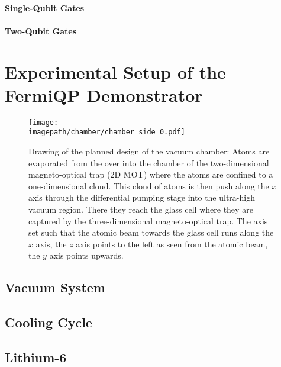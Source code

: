 \paragraph*{Single-Qubit Gates}

\paragraph*{Two-Qubit Gates}



\section{Experimental Setup of the FermiQP Demonstrator}
\begin{figure}
    \centering
    \texttt{[image: \\imagepath/chamber/chamber\_side\_0.pdf]}
    \caption{Drawing of the planned design of the vacuum chamber: Atoms are evaporated from the over into the chamber of the two-dimensional magneto-optical trap (2D MOT) where the atoms are confined to a one-dimensional cloud. This cloud of atoms is then push along the $x$ axis through the differential pumping stage into the ultra-high vacuum region. There they reach the glass cell where they are captured by the three-dimensional magneto-optical trap. The axis set such that the atomic beam towards the glass cell runs along the $x$ axis, the $z$ axis points to the left as seen from the atomic beam, the $y$ axis points upwards.}
    \label{fig:chamber}
\end{figure}

\subsection*{Vacuum System}

\subsection*{Cooling Cycle}

\subsection*{Lithium-6}
